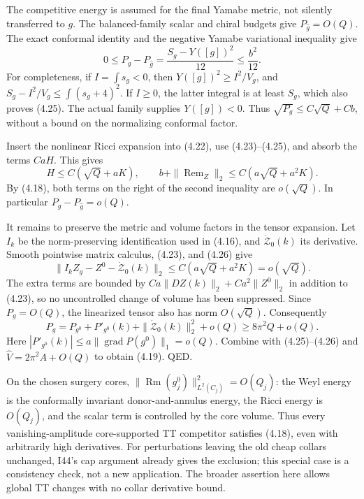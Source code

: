 \documentclass[
  10pt,
]{article}
\begin{document}
The competitive energy is assumed for the final Yamabe metric, not
silently transferred to \(g\). The balanced-family scalar and chiral
budgets give \(P_{\widehat g}=O(Q)\). The exact conformal identity and
the negative Yamabe variational inequality give \[
 0\le P_g-P_{\widehat g}
       =\frac{S_g-Y([g])^2}{12}\le\frac{b^2}{12}. \tag{4.25}
\] For completeness, if \(I=\int s_g<0\), then \(Y([g])^2\ge I^2/V_g\),
and \(S_g-I^2/V_g\le\int(s_g+4)^2\). If \(I\ge0\), the latter integral
is at least \(S_g\), which also proves (4.25). The actual family
supplies \(Y([g])<0\). Thus \(\sqrt{P_g}\le C\sqrt Q+Cb\), without a
bound on the normalizing conformal factor.

Insert the nonlinear Ricci expansion into (4.22), use (4.23)--(4.25),
and absorb the terms \(CaH\). This gives \[
 H\le C(\sqrt Q+aK),\qquad
 b+\|\operatorname{Rem}_Z\|_2
                  \le C(a\sqrt Q+a^2K). \tag{4.26}
\] By (4.18), both terms on the right of the second inequality are
\(o(\sqrt Q)\). In particular \(P_g-P_{\widehat g}=o(Q)\).

It remains to preserve the metric and volume factors in the tensor
expansion. Let \(I_k\) be the norm-preserving identification used in
(4.16), and \(\dot{\mathcal Z}_0(k)\) its derivative. Smooth pointwise
matrix calculus, (4.23), and (4.26) give \[
 \|I_k Z_g-Z^0-\dot{\mathcal Z}_0(k)\|_2
       \le C(a\sqrt Q+a^2K)=o(\sqrt Q).
 \tag{4.27}
\] The extra terms are bounded by \(Ca\|DZ(k)\|_2+Ca^2\|Z^0\|_2\) in
addition to (4.23), so no uncontrolled change of volume has been
suppressed. Since \(P_g=O(Q)\), the linearized tensor also has norm
\(O(\sqrt Q)\). Consequently \[
 P_g=P_{g^0}+P'_{g^0}(k)
                 +\|\dot{\mathcal Z}_0(k)\|_2^2+o(Q)
        \ge8\pi^2Q+o(Q).
 \tag{4.28}
\] Here \(|P'_{g^0}(k)|\le a\|\operatorname{grad}P(g^0)\|_1=o(Q)\).
Combine with (4.25)--(4.26) and \(\widehat V=2\pi^2A+O(Q)\) to obtain
(4.19). QED.

On the chosen surgery cores,
\(\|\operatorname{Rm}(g_j^0)\|_{L^2(C_j)}^2=O(Q_j)\): the Weyl energy is
the conformally invariant donor-and-annulus energy, the Ricci energy is
\(O(Q_j)\), and the scalar term is controlled by the core volume. Thus
every vanishing-amplitude core-supported TT competitor satisfies (4.18),
even with arbitrarily high derivatives. For perturbations leaving the
old cheap collars unchanged, I44's cap argument already gives the
exclusion; this special case is a consistency check, not a new
application. The broader assertion here allows global TT changes with no
collar derivative bound.
\end{document}
